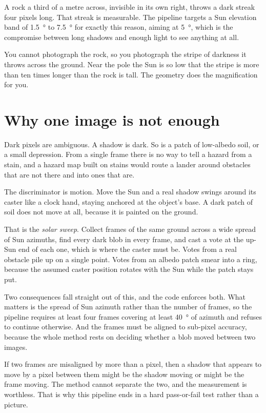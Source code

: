 \documentclass[11pt]{article}
\begin{document}
A rock a third of a metre across, invisible in its own right, throws a dark streak
four pixels long. That streak is measurable. The pipeline targets a Sun elevation
band of \SI{1.5}{\degree} to \SI{7.5}{\degree} for exactly this reason, aiming at
\SI{5}{\degree}, which is the compromise between long shadows and enough light to see
anything at all.

\begin{plainbox}
You cannot photograph the rock, so you photograph the stripe of darkness it throws
across the ground. Near the pole the Sun is so low that the stripe is more than ten
times longer than the rock is tall. The geometry does the magnification for you.
\end{plainbox}

\section{Why one image is not enough}

Dark pixels are ambiguous. A shadow is dark. So is a patch of low-albedo soil, or a
small depression. From a single frame there is no way to tell a hazard from a stain,
and a hazard map built on stains would route a lander around obstacles that are not
there and into ones that are.

The discriminator is motion. Move the Sun and a real shadow swings around its caster
like a clock hand, staying anchored at the object's base. A dark patch of soil does
not move at all, because it is painted on the ground.

That is the \emph{solar sweep}. Collect frames of the same ground across a wide
spread of Sun azimuths, find every dark blob in every frame, and cast a vote at the
up-Sun end of each one, which is where the caster must be. Votes from a real obstacle
pile up on a single point. Votes from an albedo patch smear into a ring, because the
assumed caster position rotates with the Sun while the patch stays put.

Two consequences fall straight out of this, and the code enforces both. What matters
is the spread of Sun azimuth rather than the number of frames, so the pipeline
requires at least four frames covering at least \SI{40}{\degree} of azimuth and
refuses to continue otherwise. And the frames must be aligned to sub-pixel accuracy,
because the whole method rests on deciding whether a blob moved between two images.

\begin{keepbox}
If two frames are misaligned by more than a pixel, then a shadow that appears to move
by a pixel between them might be the shadow moving or might be the frame moving. The
method cannot separate the two, and the measurement is worthless. That is why this
pipeline ends in a hard pass-or-fail test rather than a picture.
\end{keepbox}
\end{document}
